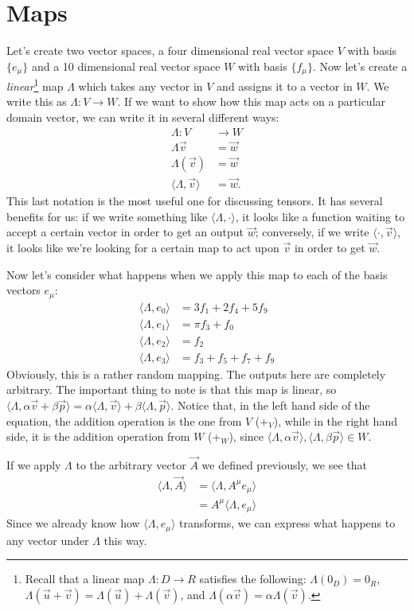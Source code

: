 \section{Maps}
Let's create two vector spaces, a four dimensional real vector space $V$ with basis $\{e_\mu\}$ and a 10 dimensional real vector space $W$ with basis $\{f_\mu\}$.
Now let's create a \emph{linear}\footnote{Recall that a linear map $\Lambda : D \to R$ satisfies the following: $\Lambda(0_D) = 0_R$, $\Lambda(\vec{u} + \vec{v}) = \Lambda(\vec{u}) + \Lambda(\vec{v})$, and $\Lambda(\alpha\vec{v}) = \alpha\Lambda(\vec{v})$.} map $\Lambda$ which takes any vector in $V$ and assigns it to a vector in $W$.
We write this as $\Lambda : V \to W$.
If we want to show how this map acts on a particular domain vector, we can write it in several different ways:
\begin{align*}
    \Lambda : V &\to W \tag{Definition} \\
    \Lambda\vec{v} &= \vec{w} \tag{Operator notation} \\
    \Lambda(\vec{v}) &= \vec{w} \tag{Function notation} \\
    \langle \Lambda,\vec{v} \rangle &= \vec{w}. \tag{Bracket notation}
\end{align*}
This last notation is the most useful one for discussing tensors.
It has several benefits for us: if we write something like $\langle \Lambda, \cdot \rangle$, it looks like a function waiting to accept a certain vector in order to get an output $\vec{w}$; conversely, if we write $\langle \cdot, \vec{v} \rangle$, it looks like we're looking for a certain map to act upon $\vec{v}$ in order to get $\vec{w}$.

Now let's consider what happens when we apply this map to each of the basis vectors $e_\mu$:
\begin{align*}
    \langle \Lambda, e_0 \rangle &= 3f_1 + 2f_4 + 5f_9 \\
    \langle \Lambda, e_1 \rangle &= \pi f_3 + f_0 \\
    \langle \Lambda, e_2 \rangle &= f_2 \\
    \langle \Lambda, e_3 \rangle &= f_3 + f_5 + f_7 + f_9
\end{align*}
Obviously, this is a rather random mapping. The outputs here are completely arbitrary. The important thing to note is that this map is linear, so $\langle \Lambda, \alpha\vec{v} + \beta\vec{p} \rangle = \alpha\langle \Lambda, \vec{v} \rangle + \beta\langle \Lambda, \vec{p} \rangle$. Notice that, in the left hand side of the equation, the addition operation is the one from $V$ ($+_V$), while in the right hand side, it is the addition operation from $W$ ($+_W$), since $\langle \Lambda, \alpha\vec{v} \rangle,\langle \Lambda, \beta\vec{p} \rangle \in W$.

If we apply $\Lambda$ to the arbitrary vector $\vec{A}$ we defined previously, we see that 
\begin{align*}
    \langle \Lambda, \vec{A} \rangle &= \langle \Lambda, A^\mu e_\mu \rangle \\
    &= A^\mu \langle \Lambda, e_\mu \rangle
\end{align*}
Since we already know how $\langle \Lambda, e_\mu \rangle$ transforms, we can express what happens to any vector under $\Lambda$ this way.
